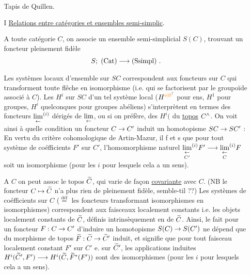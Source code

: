 
Tapis de Quillen.

I \uline{Relations entre catégories et ensembles semi-simplic}.

A toute catégorie $C$, on associe un ensemble semi-simplicial $S(C)$, trouvant  un foncteur pleinement fidèle 
\[
S;\ (\mathrm{Cat})\handwritten{\longrightarrow}(\mathrm{Ssimpl})\ .
\]

 Les systèmes locaux d'ensemble sur $SC$ correspondent aux foncteurs sur $C$ qui transforment toute flêche en isomorphisme (i.e. qui se factorisent par le groupoïde associé à $C$). Les $H^i$ sur $SC$ d'un tel système local ($H^{\unsure{o|0}}$ pour ens, $H^1$ pour groupes, $H^i$ quelconques pour groupes abéliens) s'interprètent en termes des foncteurs $\underset{\leftarrow}{\mathrm{lim}}^{(i)}$ dérigés de $\underset{\leftarrow}{\mathrm{lim}}$, ou si on préfère, des $H^i($ du \uline{topos} $C^{\wedge}$. On voit ainsi à quelle condition un foncteur $C\to C'$ induit un homotopisme $SC\to SC'$ : En vertu du critère cohomologique de Artin-Mazur, il f et s que pour tout système de coéfficients $F'$ sur $C'$, l'homomorphisme naturel $\underset{C'}{\underset{\leftarrow}{\mathrm{lim}}}^{(i)}F'\longrightarrow\underset{C}{\underset{\leftarrow}{\mathrm{lim}}}^{(i)}F$ soit un isomorphisme (pour les $i$ pour lesquels cela a un sens). 

A $C$ on peut assoc le topos $\widetilde{C}$, qui varie de façon \uline{covariante} avec $C$. (NB le foncteur $C\mapsto\widetilde{C}$ n'a plus rien de pleinement fidèle, semble-til ??) Les systèmes de coéfficients  sur $C$ ($\overset{\mathrm{déf}}{=}$ les foncteurs  transformant isomorphismes en isomorphismes) correspondent aux faisceaux localement constants i.e. les objets localement constants de $\widetilde{C}$, définis intrinsèquement en  de $\widetilde{C}$. Ainsi, le fait pour un foncteur $F:C\to C'$ d'induire un homotopisme $S(C)\to S(C')$ ne dépend que du morphisme de topos $\widetilde{F}:\widetilde{C}\to\widetilde{C}'$ induit, et signifie que pour tout faisceau localement constant $F'$ sur $C'$ e. sur $\widetilde{C}'$, les applications induites $H^i(\widetilde{C}',F')\longrightarrow H^i(\widetilde{C},\widetilde{F}^{*}(F'))$ sont des isomorphismes (pour les $i$ pour lesquels cela a un sens).

